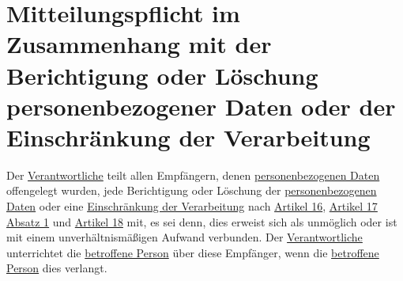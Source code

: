 \chapter{Mitteilungspflicht im Zusammenhang mit der Berichtigung oder Löschung personenbezogener Daten oder der
 Einschränkung der Verarbeitung}
\label{ch:19}


Der \hyperref[itm:04-7]{Verantwortliche} teilt allen Empfängern, denen \hyperref[itm:04-1]{personenbezogenen Daten} offengelegt wurden, jede Berichtigung oder
Löschung der \hyperref[itm:04-1]{personenbezogenen Daten} oder eine \hyperref[itm:04-3]{Einschränkung der Verarbeitung} nach \hyperref[ch:16]{Artikel 16},
\hyperref[itm:17-1]{Artikel 17 Absatz 1} und \hyperref[ch:18]{Artikel 18} mit, es sei denn, dies erweist sich als
unmöglich oder ist mit einem unverhältnismäßigen Aufwand verbunden. Der \hyperref[itm:04-7]{Verantwortliche} unterrichtet die \hyperref[itm:04-1]{betroffene
Person} über diese Empfänger, wenn die \hyperref[itm:04-1]{betroffene Person} dies verlangt.


